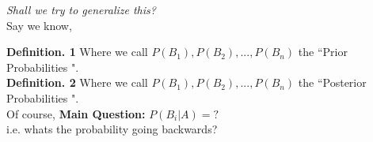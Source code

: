 \documentclass[12pt]{book}
\begin{document}
\noindent \textit{Shall we try to generalize this?}\\
\noindent Say we know, \\
\begin{center}
\end{center}

\noindent \textbf{Definition. 1} Where we call $P(B_1),P(B_2),...,P(B_n)$ the ``Prior Probabilities ".\\
\textbf{Definition. 2} Where we call $P(B_1),P(B_2),...,P(B_n)$ the ``Posterior Probabilities ".\\

\noindent Of course, \textbf{Main Question:} $P(B_i | A)=?$\\
i.e. whats the probability going backwards? \\
\end{document}
